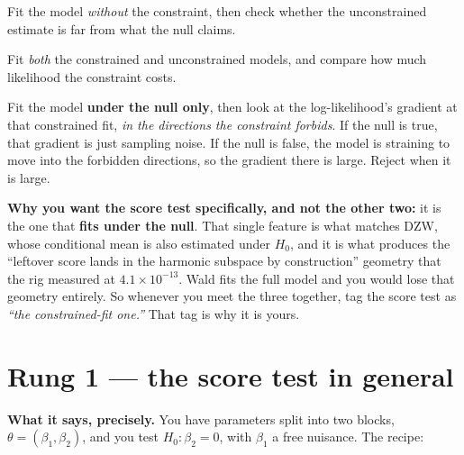 \documentclass[11pt,a4paper]{article}
\theoremstyle{definition}
\begin{document}
\begin{description}[leftmargin=1.4em,style=nextline,itemsep=0.4em]
\item[Wald] Fit the model \emph{without} the constraint, then check whether the
  unconstrained estimate is far from what the null claims.
\item[Likelihood ratio (LR)] Fit \emph{both} the constrained and unconstrained
  models, and compare how much likelihood the constraint costs.
\item[Score / Rao / Lagrange-multiplier (three names, one test)] Fit the model
  \textbf{under the null only}, then look at the log-likelihood's gradient at
  that constrained fit, \emph{in the directions the constraint forbids}. If the
  null is true, that gradient is just sampling noise. If the null is false, the
  model is straining to move into the forbidden directions, so the gradient
  there is large. Reject when it is large.
\end{description}

\noindent\textbf{Why you want the score test specifically, and not the other
two:} it is the one that \textbf{fits under the null}. That single feature is
what matches DZW, whose conditional mean is also estimated under $H_0$, and it is
what produces the ``leftover score lands in the harmonic subspace by
construction'' geometry that the rig measured at $4.1\times10^{-13}$. Wald fits
the full model and you would lose that geometry entirely. So whenever you meet
the three together, tag the score test as \emph{``the constrained-fit one.''}
That tag is why it is yours.

\section{Rung 1 --- the score test in general}

\textbf{What it says, precisely.} You have parameters split into two blocks,
$\theta=(\beta_1,\beta_2)$, and you test $H_0:\beta_2=0$, with $\beta_1$ a free
nuisance. The recipe:
\end{document}
